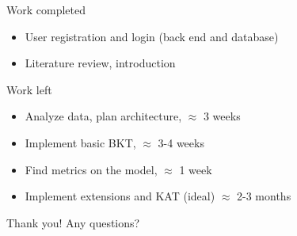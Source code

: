 \documentclass[11pt]{beamer}
\begin{document}
\begin{frame}{Work completed}
	\begin{itemize}
		\item<1-> User registration and login (back end and database)
		\item<2-> Literature review, introduction
	\end{itemize}
\end{frame}

\begin{frame}{Work left}
	\begin{itemize}
		\item<1-> Analyze data, plan architecture, $\approx$ 3 weeks
		\item<2-> Implement basic BKT, $\approx$ 3-4 weeks
		\item<3-> Find metrics on the model, $\approx$ 1 week
		\item<4-> Implement extensions and KAT (ideal) $\approx$ 2-3 months
	\end{itemize}
\end{frame}

\begin{frame}{Thank you!}
	Any questions?
\end{frame}
\end{document}

